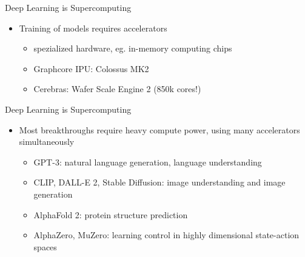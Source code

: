 \begin{frame}{Deep Learning is Supercomputing}
\protect\hypertarget{deep-learning-is-supercomputing-1}{}
\begin{itemize}
\tightlist
\item
  Training of models requires accelerators

  \begin{itemize}
  \tightlist
  \item
    spezialized hardware, eg. in-memory computing chips
  \item
    Graphcore IPU: Colossus MK2
  \item
    Cerebras: Wafer Scale Engine 2 (850k cores!)
  \end{itemize}
\end{itemize}

\end{frame}

\begin{frame}{Deep Learning is Supercomputing}
\protect\hypertarget{deep-learning-is-supercomputing-2}{}
\begin{itemize}
\tightlist
\item
  Most breakthroughs require heavy compute power, using many
  accelerators simultaneously

  \begin{itemize}
  \tightlist
  \item
    GPT-3: natural language generation, language understanding
  \item
    CLIP, DALL-E 2, Stable Diffusion: image understanding and image
    generation\\
  \item
    AlphaFold 2: protein structure prediction
  \item
    AlphaZero, MuZero: learning control in highly dimensional
    state-action spaces
  \end{itemize}
\end{itemize}

\end{frame}

